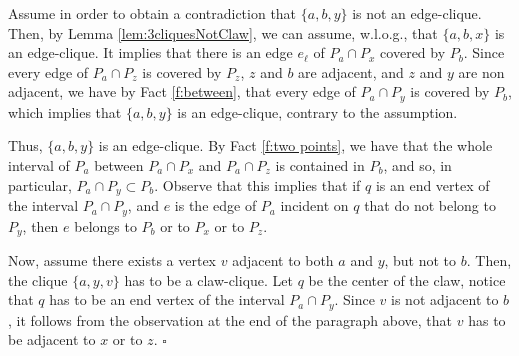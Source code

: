 \documentclass[9pt]{entcs}
\begin{document}
\begin{pf}
Assume in order to obtain a contradiction that $\{a,b,y\}$ is not an edge-clique. Then, by Lemma
\ref{lem:3cliquesNotClaw}, we can assume, w.l.o.g., that $\{a,b,x\}$ is an edge-clique.
It implies that there is an edge $e_{\ell}$ of $P_a \cap P_x$ covered by $P_b$. Since every  edge
of $P_a\cap P_z$ is covered  by $P_z$, $z$ and $b$ are adjacent, and $z$ and $y$ are non adjacent, we have by Fact \ref{f:between},
that every edge of $P_a\cap P_y$ is covered by $P_b$, which implies  that $\{a,b,y\}$ is an edge-clique, contrary to the assumption.

Thus, $\{a,b,y\}$ is an edge-clique. By Fact \ref{f:two points}, we have that the whole interval of $P_a$ between 
 $P_a \cap P_x$ and   $P_a \cap P_z$ is contained in $P_b$, and so, in particular, $P_a\cap P_y \subset P_b$. Observe that this
 implies that if $q$ is an end vertex of the interval $P_a \cap P_y$, and $e$ is the edge of $P_a$ incident on $q$ that do not belong to $P_y$, then 
$e$ belongs to $P_b$ or to $P_x$ or to $P_z$.
 
 Now, assume there exists a vertex $v$ adjacent to both $a$ and $y$, but not to $b$. Then, the clique $\{a,y,v\}$ has to be a claw-clique. Let $q$ be the center of the claw, notice that $q$ has to be an end vertex of the interval $P_a \cap P_y$.
 Since $v$ is not adjacent to $b$, it follows from the observation at the end of the paragraph above, that
 $v$ has to be adjacent to $x$ or to $z$.
\hfill $\square$


\end{pf}
\end{document}
